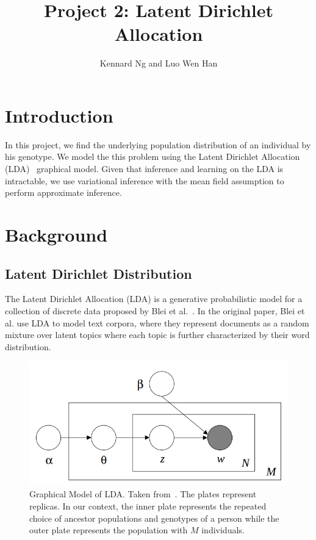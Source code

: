 \documentclass[a4paper]{article}
\author{Kennard Ng and Luo Wen Han}
\title{Project 2: Latent Dirichlet Allocation}
\begin{document}
	\maketitle
	\section{Introduction}
	
	In this project, we find the underlying population distribution of an individual by his genotype.
	We model the this problem using the Latent Dirichlet Allocation (LDA)~\cite{blei2003latent} graphical model. Given that inference and learning on the LDA is intractable, we use variational inference with the mean field assumption to perform approximate inference.
	
	\section{Background}
	
	\subsection{Latent Dirichlet Distribution}
	The Latent Dirichlet Allocation (LDA) is a generative probabilistic model for a collection  of discrete data proposed by Blei et al.~\cite{blei2003latent}. In the original paper, Blei et al. use LDA to model text corpora, where they represent documents as a random mixture over latent topics where each topic is further characterized by their word distribution. 
	
	\begin{figure}[ht]
		\centering
		\captionsetup{width=.8\linewidth}
		\includegraphics[width=0.6\linewidth]{images/lda_graphical}
		\caption{Graphical Model of LDA. Taken from~\cite{blei2003latent}. The plates represent replicas. In our context, the inner plate represents the repeated choice of ancestor populations and genotypes of a person while the outer plate represents the population with $M$ individuals.}
		\label{fig:ldagraphical}
	\end{figure}
\end{document}
